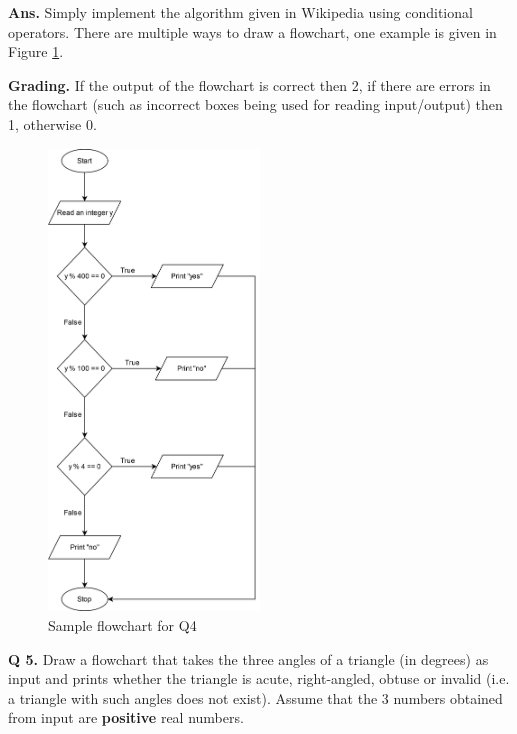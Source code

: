 \documentclass{article}
\begin{document}
\begin{flushleft}

\textbf{Ans. } Simply implement the algorithm given in Wikipedia using conditional
operators. There are multiple ways to draw a flowchart, one example is given in 
Figure \ref{Q4}.

\end{flushleft}

\begin{flushleft}

\textbf{Grading. } If the output of the flowchart is correct then 2, if there are 
errors in the flowchart (such as incorrect boxes being used for reading input/output)
then 1, otherwise 0.
    
\end{flushleft}

\begin{figure}[ht]
    \centering
    \includegraphics[width=0.5\textwidth]{Q4.png}
    \caption{Sample flowchart for Q4}
    \label{Q4}
\end{figure}

\clearpage

\begin{flushleft}

\textbf{Q 5. } Draw a flowchart that takes the three angles of a triangle (in degrees)
as input and prints whether the triangle is acute, right-angled, obtuse or invalid 
(i.e. a triangle with such angles does not exist). Assume that the 3 numbers obtained 
from input are \textbf{positive} real numbers.
    
\end{flushleft}
\end{document}
